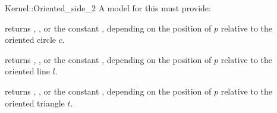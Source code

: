 \begin{ccRefFunctionObjectConcept}{Kernel::Oriented_side_2}
A model for this must provide:


{returns ,
, or the constant ,
depending on the position of $p$  relative to the oriented circle $c$.}

{returns ,
, or the constant ,
depending on the position of $p$  relative to the oriented line $l$.}

{returns ,
, or the constant ,
depending on the position of $p$  relative to the oriented triangle $t$.}

\end{ccRefFunctionObjectConcept}
